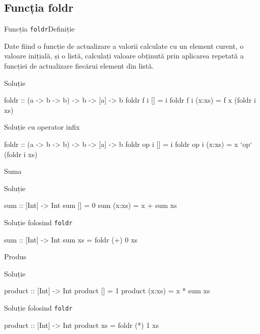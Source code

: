 \documentclass[xcolor=pdftex,romanian,colorlinks]{beamer}
\begin{document}
\subsection{Funcția foldr}


\begin{frame}[fragile]{Funcția \lstinline$foldr$}{Definiție}
\begin{block}{}
Date fiind o funcție de actualizare a valorii calculate cu un element curent, o valoare inițială, și o listă, calculați valoare obținută prin aplicarea repetată a funcției de actualizare fiecărui element din listă.
\end{block}
\begin{block}{Soluție }
\begin{asciihs}
foldr :: (a -> b -> b) -> b -> [a] -> b
foldr f i []     = i
foldr f i (x:xs) = f x (foldr i xs)
\end{asciihs}
\end{block}

\begin{block}{Soluție  cu operator infix}
\begin{asciihs}
foldr :: (a -> b -> b) -> b -> [a] -> b
foldr op i []     = i
foldr op i (x:xs) = x `op` (foldr i xs)
\end{asciihs}
\end{block}
\end{frame}


\begin{frame}[fragile]{Suma}
\begin{block}{Soluție }
\begin{asciihs}
sum :: [Int] -> Int
sum []     = 0
sum (x:xs) = x + sum xs
\end{asciihs}
\end{block}
\begin{block}{Soluție folosind \lstinline$foldr$}
\begin{asciihs}
sum :: [Int] -> Int
sum xs = foldr (+) 0 xs
\end{asciihs}
\end{block}
\end{frame}

\begin{frame}[fragile]{Produs}
\begin{block}{Soluție }
\begin{asciihs}
product :: [Int] -> Int
product []     = 1
product (x:xs) = x * sum xs
\end{asciihs}
\end{block}
\begin{block}{Soluție folosind \lstinline$foldr$}
\begin{asciihs}
product :: [Int] -> Int
product xs = foldr (*) 1 xs
\end{asciihs}
\end{block}
\end{frame}
\end{document}
